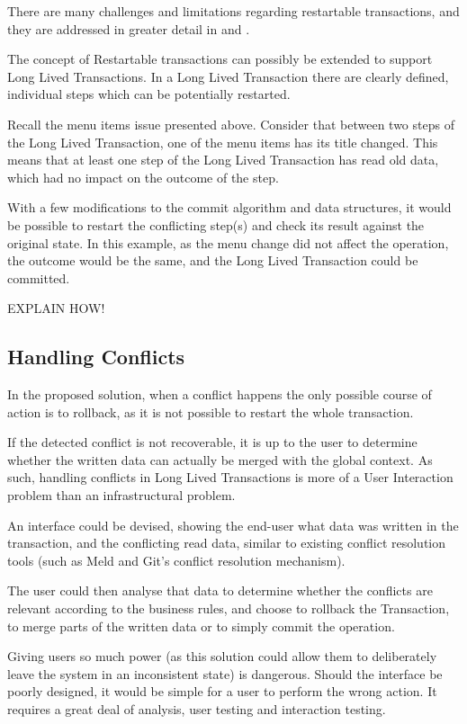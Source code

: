 There are many challenges and limitations regarding restartable
transactions, and they are addressed in greater detail in
\cite{cachopo2006versioned} and \cite{BrunoJorgeGasparFranco2013}.

The concept of Restartable transactions can possibly be extended to
support Long Lived Transactions. In a Long Lived Transaction there are
clearly defined, individual steps which can be potentially restarted.

Recall the menu items issue presented above. Consider that between two
steps of the Long Lived Transaction, one of the menu items has its
title changed. This means that at least one step of the Long Lived
Transaction has read old data, which had no impact on the outcome of
the step.

With a few modifications to the commit algorithm and data structures,
it would be possible to restart the conflicting step(s) and check its
result against the original state. In this example, as the menu change
did not affect the operation, the outcome would be the same, and the
Long Lived Transaction could be committed.

EXPLAIN HOW!


\subsection{Handling Conflicts}

In the proposed solution, when a conflict happens the only possible
course of action is to rollback, as it is not possible to restart the
whole transaction.

If the detected conflict is not recoverable, it is up to the user to
determine whether the written data can actually be merged with the
global context. As such, handling conflicts in Long Lived Transactions
is more of a User Interaction problem than an infrastructural problem.

An interface could be devised, showing the end-user what data was
written in the transaction, and the conflicting read data, similar to
existing conflict resolution tools (such as Meld and Git's conflict
resolution mechanism).

The user could then analyse that data to determine whether the
conflicts are relevant according to the business rules, and choose to
rollback the Transaction, to merge parts of the written data or to
simply commit the operation.

Giving users so much power (as this solution could allow them to
deliberately leave the system in an inconsistent state) is
dangerous. Should the interface be poorly designed, it would be simple
for a user to perform the wrong action. It requires a great deal of
analysis, user testing and interaction testing.

